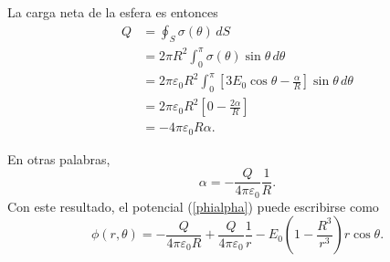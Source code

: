 La carga neta de la esfera es entonces
\begin{align}
Q &= \oint_S\sigma(\theta)\,dS \\
&= 2\pi R^2 \int_0^\pi \sigma(\theta)\sin\theta\,d\theta \\
&= 2\pi \varepsilon_0R^2 \int_0^\pi \left[3E_0\cos\theta-\frac{\alpha}{R}\right] \sin\theta\,d\theta \\
&= 2\pi \varepsilon_0R^2 \left[ 0-\frac{2\alpha}{R}\right] \\
&= -4\pi \varepsilon_0R \alpha .
\end{align}

En otras palabras, 
\begin{equation}
\alpha=-\frac{Q}{4\pi \varepsilon_0}\frac{1}{R}.
\end{equation}
Con este resultado, el potencial (\ref{phialpha}) puede escribirse como 
\begin{equation}
\phi(r,\theta)=-\frac{Q}{4\pi\varepsilon_0 R}+\frac{Q}{4\pi\varepsilon_0}\frac{1}{r} -E_0 \left(1-\frac{R^3}{r^3}\right)r\cos\theta.
\end{equation}

